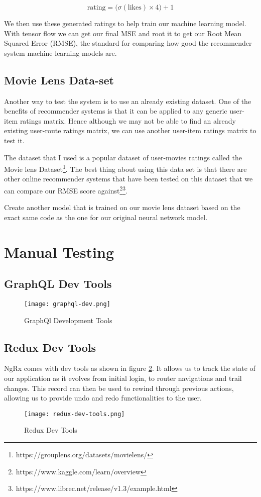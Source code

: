 \begin{equation} \label{eqn:RatingCalculation}
    \textrm{rating} = \big(\sigma(\textrm{likes}) \times 4\big) + 1
\end{equation}

We then use these generated ratings to help train our machine learning model. With tensor flow we can get our final MSE and root it to get our Root Mean Squared Error (RMSE), the standard for comparing how good the recommender system machine learning models are.

\subsection{Movie Lens Data-set}
Another way to test the system is to use an already existing dataset. One of the benefits of recommender systems is that it can be applied to any generic user-item ratings matrix. Hence although we may not be able to find an already existing user-route ratings matrix, we can use another user-item ratings matrix to test it.

The dataset that I used is a popular dataset of user-movies ratings called the Movie lens Dataset\footnote{https://grouplens.org/datasets/movielens/}. The best thing about using this data set is that there are other online recommender systems that have been tested on this dataset that we can compare our RMSE score against\footnote{https://www.kaggle.com/learn/overview}\footnote{https://www.librec.net/release/v1.3/example.html}.

Create another model that is trained on our movie lens dataset based on the exact same code as the one for our original neural network model.

\section{Manual Testing}
\subsection{GraphQL Dev Tools}
\begin{figure}[ht]
    \centering
    \texttt{[image: graphql-dev.png]}
    \caption{GraphQl Development Tools}
    \label{fig:graphQLDevTools}
\end{figure}

\subsection{Redux Dev Tools}
NgRx comes with dev tools as shown in figure \ref{fig:reduxDevTools}. It allows us to track the state of our application as it evolves from initial login, to router navigations and trail changes. This record can then be used to rewind through previous actions, allowing us to provide undo and redo functionalities to the user.
\begin{figure}[ht]
    \centering
    \texttt{[image: redux-dev-tools.png]}
    \caption{Redux Dev Tools}
    \label{fig:reduxDevTools}
\end{figure}


